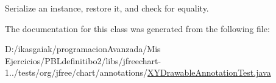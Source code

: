 Serialize an instance, restore it, and check for equality. 

The documentation for this class was generated from the following file\+:\begin{DoxyCompactItemize}
\item 
D\+:/ikasgaiak/programacion\+Avanzada/\+Mis Ejercicios/\+P\+B\+Ldefinitibo2/libs/jfreechart-\/1../tests/org/jfree/chart/annotations/\mbox{\hyperlink{_x_y_drawable_annotation_test_8java}{X\+Y\+Drawable\+Annotation\+Test.\+java}}\end{DoxyCompactItemize}
